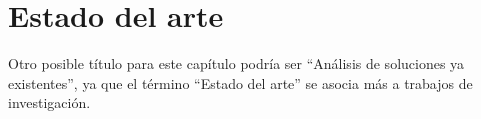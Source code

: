 \documentclass[../main.tex]{subfiles}
\begin{document}
\chapter{Estado del arte}
\label{C:estado_arte}

Otro posible título para este capítulo podría ser ``Análisis de soluciones ya existentes'', ya que el término ``Estado del arte'' se asocia más a trabajos de investigación.
\end{document}
